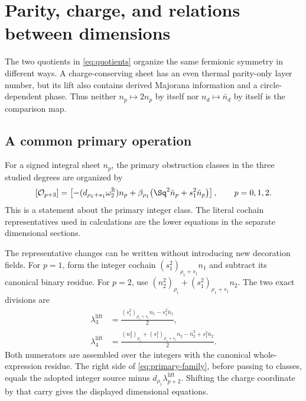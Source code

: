 \section{Parity, charge, and relations between dimensions}\label{sec:parity}\label{sec:dimension}
The two quotients in \eqref{eq:quotients} organize the same fermionic symmetry in different ways. A charge-conserving sheet has an even thermal parity-only layer number, but its lift also contains derived Majorana information and a circle-dependent phase. Thus neither $n_p\mapsto2n_p$ by itself nor $n_d\mapsto\bar n_d$ by itself is the comparison map.

\subsection{A common primary operation}\label{subsec:primary-family}
For a signed integral sheet $n_p$, the primary obstruction classes in the three studied degrees are organized by
\begin{equation}\label{eq:primary-family}
 [\mathcal O_{p+3}]
 =\left[-(d_{\rho_1+s_1}\omega_2^{\mathbb R})n_p
 +\beta_{\rho_1}\big(\Sq^2\bar n_p+s_1^2\bar n_p\big)\right],
 \qquad p=0,1,2.
\end{equation}
This is a statement about the primary integer class. The literal cochain representatives used in calculations are the lower equations in the separate dimensional sections.

The representative changes can be written without introducing new decoration fields. For $p=1$, form the integer cochain $(s_1^2)_{\rho_1+s_1}n_1$ and subtract its canonical binary residue. For $p=2$, use $(n_2^2)_{\rho_1}+(s_1^2)_{\rho_1+s_1}n_2$. The two exact divisions are
\begin{align}\label{eq:integer-coordinate-carries}
 \lambda_3^{\mathrm{lift}}
 &=\frac{(s_1^2)_{\rho_1+s_1}n_1-\overline{s_1^2\bar n_1}}2,\\
 \lambda_4^{\mathrm{lift}}
 &=\frac{(n_2^2)_{\rho_1}+(s_1^2)_{\rho_1+s_1}n_2
            -\overline{\bar n_2^2+s_1^2\bar n_2}}2.
\end{align}
Both numerators are assembled over the integers with the canonical whole-expression residue. The right side of \eqref{eq:primary-family}, before passing to classes, equals the adopted integer source minus $d_{\rho_1}\lambda_{p+2}^{\mathrm{lift}}$. Shifting the charge coordinate by that carry gives the displayed dimensional equations.

